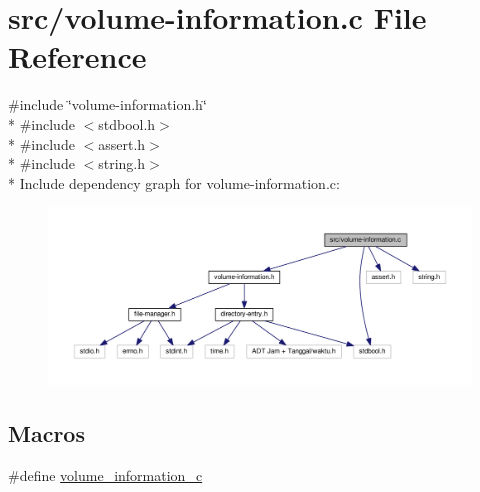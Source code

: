\hypertarget{volume-information_8c}{\section{src/volume-\/information.c File Reference}
\label{volume-information_8c}
}
{\ttfamily \#include \char`\"{}volume-\/information.\-h\char`\"{}}\\*
{\ttfamily \#include $<$stdbool.\-h$>$}\\*
{\ttfamily \#include $<$assert.\-h$>$}\\*
{\ttfamily \#include $<$string.\-h$>$}\\*
Include dependency graph for volume-\/information.c\-:
\nopagebreak
\begin{figure}[H]
\begin{center}
\leavevmode
\includegraphics[width=350pt]{volume-information_8c__incl}
\end{center}
\end{figure}
\subsection*{Macros}
\begin{DoxyCompactItemize}
\item 
\#define \hyperlink{volume-information_8c_aa2ebcd0c3a3beac7a43ef1b7be6be0b3}{volume\-\_\-information\-\_\-c}
\end{DoxyCompactItemize}
